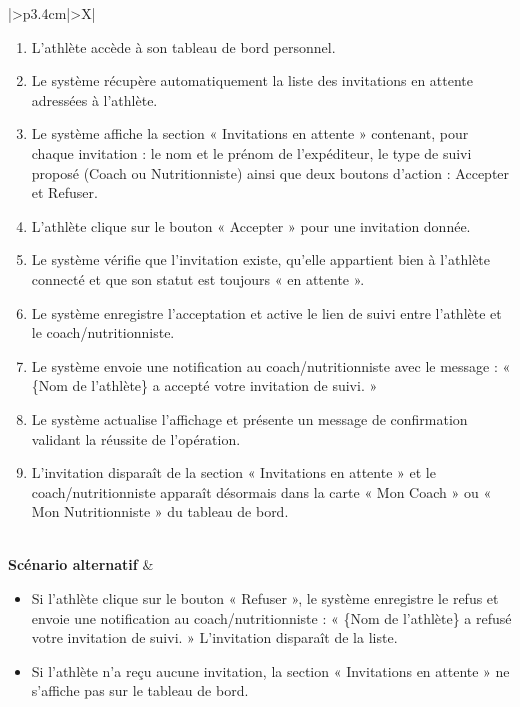 ﻿\documentclass[a4paper,12pt]{report}
\begin{document}
\begin{table}[H]
\begin{tabularx}{\textwidth}{|>{\RaggedRight\arraybackslash}p{3.4cm}|>{\RaggedRight\arraybackslash}X|}
\begin{minipage}[t]{\linewidth}
\begin{enumerate}[label=\arabic*., leftmargin=*, topsep=0pt, itemsep=1pt]
    \item L'athlète accède à son tableau de bord personnel.
    \item Le système récupère automatiquement la liste des invitations en attente adressées à l'athlète.
    \item Le système affiche la section « Invitations en attente » contenant, pour chaque invitation : le nom et le prénom de l'expéditeur, le type de suivi proposé (Coach ou Nutritionniste) ainsi que deux boutons d'action : Accepter et Refuser.
    \item L'athlète clique sur le bouton « Accepter » pour une invitation donnée.
    \item Le système vérifie que l'invitation existe, qu'elle appartient bien à l'athlète connecté et que son statut est toujours « en attente ».
    \item Le système enregistre l'acceptation et active le lien de suivi entre l'athlète et le coach/nutritionniste.
    \item Le système envoie une notification au coach/nutritionniste avec le message : « \{Nom de l'athlète\} a accepté votre invitation de suivi. »
    \item Le système actualise l'affichage et présente un message de confirmation validant la réussite de l'opération.
    \item L'invitation disparaît de la section « Invitations en attente » et le coach/nutritionniste apparaît désormais dans la carte « Mon Coach » ou « Mon Nutritionniste » du tableau de bord.
\end{enumerate}
\vspace{2pt}
\end{minipage} \\
\hline
\textbf{Scénario alternatif} &
\begin{minipage}[t]{\linewidth}\sloppy
\vspace{2pt}
\begin{itemize}[leftmargin=*, topsep=0pt, itemsep=1pt]
    \item  Si l'athlète clique sur le bouton « Refuser », le système enregistre le refus et envoie une notification au coach/nutritionniste : « \{Nom de l'athlète\} a refusé votre invitation de suivi. » L'invitation disparaît de la liste.
  
    \item  Si l'athlète n'a reçu aucune invitation, la section « Invitations en attente » ne s'affiche pas sur le tableau de bord.
\end{itemize}
\vspace{2pt}
\end{minipage} \\
\hline
\end{tabularx}
\fussy
\end{table}
\endgroup
\end{document}
